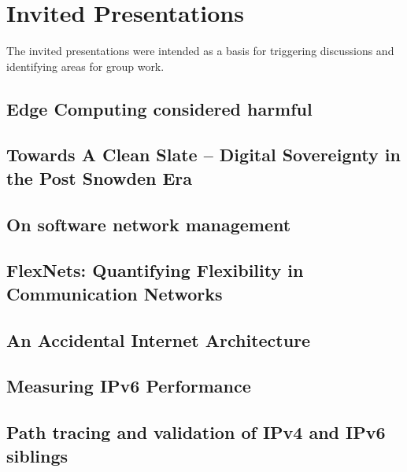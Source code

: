 \section{Invited Presentations}\label{sec:invited-presentations}

The invited presentations were intended as a basis for triggering discussions
and identifying areas for group work.

\subsection{Edge Computing considered harmful}


\subsection{Towards A Clean Slate -- Digital Sovereignty in the Post Snowden Era}


\subsection{On software network management}


\subsection{FlexNets: Quantifying Flexibility in Communication Networks}


\subsection{An Accidental Internet Architecture}


\subsection{Measuring IPv6 Performance}


\subsection{Path tracing and validation of IPv4 and IPv6 siblings}


